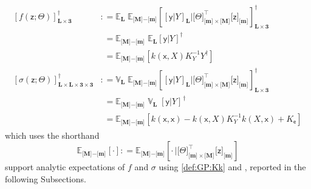 \documentclass[preprint,12pt]{elsarticle}
\newcommand*{\M}[1]{\ensuremath{#1}\xspace}
\newcommand*{\x}{\times}
\newcommand*{\mi}[1]{\mathbf{#1}}
\newcommand*{\rv}[1]{\mathsf{#1}}
\newcommand*{\te}[2][]{\left\lbrack{#2}\right\rbrack_{#1}}
\newcommand*{\tte}[2][]{\lbrack{#2}\rbrack_{#1}}
\newcommand*{\tse}[2][]{\mi{\lbrack#2\rbrack}_{#1}}
\newcommand*{\tme}[3][]{\lbrack{#3}\rbrack_{\tse[#1]{#2}}}
\newcommand*{\deq}{\M{\mathrel{\mathop:}=}}
\newcommand*{\ev}[3][]{\mathbb{E}_{#3}^{#1}\!\left\lbrack{#2}\right\rbrack}
\newcommand*{\evt}[3][]{\mathbb{E}_{#3}^{#1}\!#2}
\newcommand*{\covt}[2]{\mathbb{V}_{#2}\!{#1}}
\begin{document}
        \begin{equation*}
            \begin{aligned}
                \te[\mi{L\x 3}]{f({\rv{z}}; \Theta)}^{\dagger} &\deq
                \evt{\;\evt{\te[\mi{L\x 3}]{\te[\mi{L}]{\rv{y} \vert Y} 
                \big\vert \tte[\tse{m}\x\tse{M}]{\Theta}^{\intercal} \tme{m}{\rv{z}}}}{\tse{M}\mi{-}\tse{m}}^{\dagger}}{\mi{L}} \\
                &\phantom{:}= \evt{\;\evt{\te{\rv{y} \vert Y}}{\mi{L}}^{\dagger}}{\tse{M}\mi{-}\tse{m}} \\
                &\phantom{:}= \evt{\te{k(\rv{x},X) K_{Y}^{-1} Y^{\dagger}}}{\tse{M}\mi{-}\tse{m}} \\
                \te[\mi{L\x L\x 3\x 3}]{\sigma({\rv{z}}; \Theta)}^{\dagger} &\deq
                \covt{\;\evt{\te[\mi{L\x 3}]{\te[\mi{L}]{\rv{y} \vert Y} 
                \big\vert \tte[\tse{m}\x\tse{M}]{\Theta}^{\intercal} \tme{m}{\rv{z}}}}{\tse{M}\mi{-}\tse{m}}^{\dagger}}{\mi{L}} \\
                &\phantom{:}= \evt{\;\covt{\;\te{\rv{y} \vert Y}}{\mi{L}}^{\dagger}}{\tse{M}\mi{-}\tse{m}} \\
                &\phantom{:}= \evt{\te{k(\rv{x},\rv{x}) - k(\rv{x},X) K_{Y}^{-1} k(X,\rv{x}) 
                + K_{\rv{e}}}}{\tse{M}\mi{-}\tse{m}}
            \end{aligned}                    
        \end{equation*}
        which uses the shorthand
        \begin{equation*}
            \ev{\cdot }{\tse{M}\mi{-}\tse{m}} \deq
            \ev{\cdot \,
            \big\vert \tte[\tse{m}\x\tse{M}]{\Theta}^{\intercal} \tme{m}{\rv{z}}}
            {\tse{M}\mi{-}\tse{m}}
        \end{equation*}
         support analytic expectations of $f$ and $\sigma$ using 
        \cref{def:GP:Kk} and , reported in the following Subsections.
\end{document}

